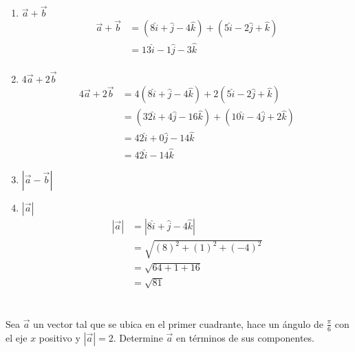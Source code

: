 \documentclass[12pt]{article}
\begin{document}
\begin{enumerate}[label=\alph*), format=\textbf]
  
\item $\vec{a} + \vec{b}$
  \begin{equation*}
    \begin{split}
      \vec{a} + \vec{b}
      &= (8\hat{i} + \hat{j} - 4\hat{k}) + (5\hat{i} - 2\hat{j} +\hat{k}) \\
      &= 13\hat{i} - 1\hat{j} - 3\hat{k} \\
    \end{split}
  \end{equation*}
  
\item $4 \vec{a} + 2\vec{b}$
  \begin{equation*}
    \begin{split}
      4 \vec{a} + 2\vec{b}
      &= 4 (8\hat{i} + \hat{j} - 4\hat{k}) + 2 (5\hat{i} - 2\hat{j} +\hat{k}) \\
      &= (32\hat{i} + 4\hat{j} - 16\hat{k}) + (10\hat{i} - 4\hat{j} + 2\hat{k}) \\
      &= 42\hat{i} + 0\hat{j} - 14\hat{k} \\
      &= 42\hat{i} - 14\hat{k}
    \end{split}
  \end{equation*}

\item $|\vec{a} - \vec{b}|$

\item $|\vec{a}|$
  \begin{equation*}
    \begin{split}
      |\vec{a}|
      &= | 8\hat{i} + \hat{j} - 4\hat{k} | \\
      &= \sqrt{(8)^2 + (1)^2 + (-4)^2} \\
      &= \sqrt{64 + 1 + 16} \\
      &= \sqrt{81}
    \end{split}
  \end{equation*}

\end{enumerate}

\section{}

Sea $\vec{a}$ un vector tal que se ubica en el primer cuadrante, hace un ángulo de $\frac{\pi}{6}$ con el eje $x$ positivo  y $|\vec{a}|=2$. Determine $\vec{a}$ en términos de sus componentes.
\end{document}
